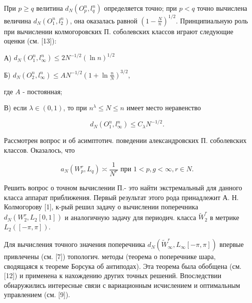 \documentclass[10pt]{article}
\begin{document}
При $p \geqslant q$ велитина $d_{N}\left(O_{p}^{n}, l_{q}^{n}\right)$ определяется точно; при $p<q$ точно вычислена величина $d_{N}\left(O_{1}^{n}, l_{2}^{n}\right)$, она оказалась равной $\left(1-\frac{N}{n}\right)^{1 / 2}$. Принципиальную роль при вычислении колмогоровских П. соболевских классов играют следующие оценки (см. [13]):



А) $d_{N}\left(O_{1}^{n}, l_{\infty}^{n}\right) \leqslant 2 N^{-1 / 2}(\ln n)^{1 / 2}$



Б) $d_{N}\left(O_{2}^{n}, l_{\infty}^{n}\right) \leqslant A N^{-1 / 2}\left(1+\ln \frac{n}{N}\right)^{3 / 2}$,



где $A$ - постоянная;



В) если $\lambda \in(0,1)$, то при $n^{\lambda} \leqslant N \leqslant n$ имеет место неравенство



\[

d_{N}\left(O_{1}^{n}, l_{\infty}^{n}\right) \leqslant C_{\lambda} N^{-1 / 2} .

\]



Рассмотрен вопрос и об асимптотич. поведении александровских П. соболевских классов. Оказалось, что



\[

a_{N}\left(W_{p}^{r}, L_{q}\right) \asymp \frac{1}{N^{r}} \text { при } 1<p, g<\infty, r \in N .

\]



Решить вопрос о точном вычислении П.- это найти экстремальный для данного класса аппарат приближения. Первый результат этого рода принадлежит А. Н. Колмогорову [1], к-рый решил задачу о вычислении поперечника $d_{N}\left(W_{2}^{r}, L_{2}[0,1]\right)$ и аналогичную задачу для периодич. класса $\tilde{W}_{2}^{r}$ в метрике $L_{2}([-\pi, \pi])$.



Для вычисления точного значения поперечника $d_{N}\left(\tilde{W}_{\infty}^{r}, L_{\infty}[-\pi, \pi]\right)$ впервые привлечены (см. [7]) топологич. методы (теорема о поперечнике шара, сводящаяся к теореме Борсука об антиподах). Эта теорема была обобщена (см. [12]) и применена к нахождению других точных решений. Впоследствии обнаружились интересные связи с вариационным исчислением и оптимальным управлением (см. [9]).
\end{document}
